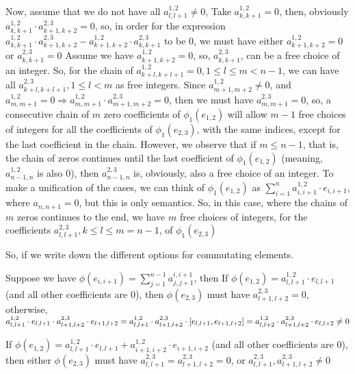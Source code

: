 \documentclass[12pt]{article}
\begin{document}
Now, assume that we do not have all $a_{l,l+1}^{1,2} \neq 0$, \newline
Take $a_{k,k+1}^{1,2}=0$, then, obviously $a_{k,k+1}^{1,2} \cdot a_{k+1,k+2}^{2,3}=0$, \newline
so, in order for the expression $a_{k,k+1}^{1,2} \cdot a_{k+1,k+2}^{2,3}-a_{k+1,k+2}^{1,2} \cdot a_{k,k+1}^{2,3}$ to be $0$, we must have either $a_{k+1,k+2}^{1,2}=0$ or $a_{k,k+1}^{2,3}=0$ \newline
Assume we have $a_{k+1,k+2}^{1,2}=0$, so, $a_{k,k+1}^{2,3}$, can be a free choice of an integer. \newline
So, for the chain of $a_{k+l,k+l+1}^{1,2}=0, 1 \leq l \leq m < n-1$, we can have all $a_{k+l,k+l+1}^{2,3}, 1 \leq l < m$ as free integers. Since $a_{m+1,m+2}^{1,2} \neq 0$, \newline
and $a_{m,m+1}^{1,2}=0 \Rightarrow a_{m,m+1}^{1,2} \cdot a_{m+1,m+2}^{2,3}=0$, then we must have $a_{m,m+1}^{2,3}=0$, so, a consecutive chain of $m$ zero coefficients of $\phi_1(e_{1,2})$ will allow $m-1$ free choices of integers for all the coefficients of $\phi_1(e_{2,3})$, with the same indices, except for the last coefficient in the chain. \newline
However, we observe that if $m \leq n-1$, that is, the chain of zeros continues until the last coefficient of $\phi_1(e_{1,2})$ (meaning, $a_{n-1,n}^{1,2}$ is also $0$), then $a_{n-1,n}^{2,3}$ is, obviously, also a free choice of an integer. To make a unification of the cases, we can think of $\phi_1(e_{1,2})$ as $\sum_{i=1}^n a_{i,i+1}^{1,2} \cdot e_{i,i+1}$, where $a_{n,n+1}=0$, but this is only semantics. \newline
So, in this case, where the chains of $m$ zeros continues to the end, we have $m$ free choices of integers, for the coefficients $a_{l,l+1}^{2,3}, k \leq l \leq m = n-1$, \newline
of $\phi_1(e_{2,3})$

So, if we write down the different options for commutating elements.

Suppose we have $\phi(e_{i,i+1})=\sum_{j=1}^{n-1} a_{j,j+1}^{i,i+1}$, then \newline
If $\phi(e_{1,2})=a_{l,l+1}^{1,2} \cdot e_{l,l+1}$ (and all other coefficients are $0$), \newline 
then $\phi(e_{2,3})$ must have $a_{l+1,l+2}^{2,3}=0$, otherwise, $a_{l,l+1}^{1,2} \cdot e_{l,l+1} \cdot a_{l+1,l+2}^{2,3} \cdot e_{l+1,l+2}= \newline
a_{l,l+1}^{1,2} \cdot a_{l+1,l+2}^{2,3} \cdot [e_{l,l+1},e_{l+1,l+2}]=a_{l,l+2}^{1,2} \cdot a_{l+1,l+2}^{2,3} \cdot e_{l,l+2} \neq 0$ \newline

If $\phi(e_{1,2})=a_{l,l+1}^{1,2} \cdot e_{l,l+1}+a_{i+1,i+2}^{1,2} \cdot e_{i+1,i+2}$ (and all other coefficients are $0$), \newline 
then either $\phi(e_{2,3})$ must have $a_{l,l+1}^{2,3}=a_{l+1,l+2}^{2,3}=0$,
or $a_{l,l+1}^{2,3}, a_{l+1,l+2}^{2,3} \neq 0$
\end{document}
